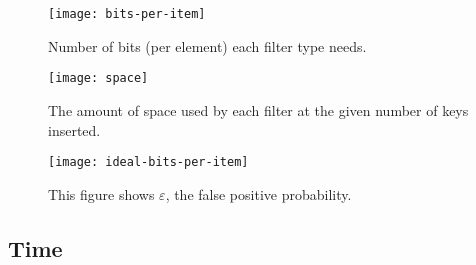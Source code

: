 \documentclass[letterpaper,twocolumn,10pt]{article}
\begin{document}




\begin{figure}

  \texttt{[image: bits-per-item]}
  \caption{  \label{bits-per-item}
Number of bits (per element) each filter type needs.}
\end{figure}

\begin{figure}
  \texttt{[image: space]}
  \caption{
    \label{space-steps}
    The amount of space used by each filter at the given number of keys inserted.
  }
\end{figure}

\begin{figure}
  \texttt{[image: ideal-bits-per-item]}
  \caption{  \label{ideal-bits-per-item}
    This figure shows $\varepsilon$, the false positive probability.
  }
\end{figure}





\subsection{Time}
\end{document}
